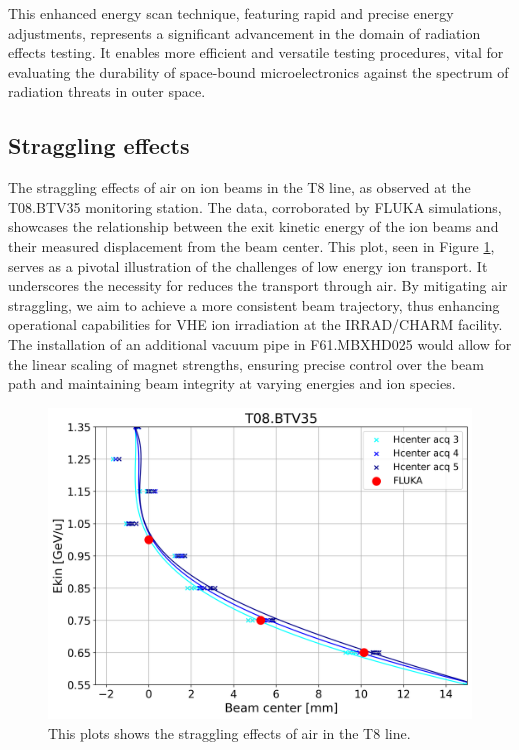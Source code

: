 \documentclass[a4paper,
               biblatex,     %
               ]{jacow}
\begin{document}
This enhanced energy scan technique, featuring rapid and precise energy adjustments, represents a significant advancement in the domain of radiation effects testing. It enables more efficient and versatile testing procedures, vital for evaluating the durability of space-bound microelectronics against the spectrum of radiation threats in outer space.

\subsection{Straggling effects}

The straggling effects of air on ion beams in the T8 line, as observed at the T08.BTV35 monitoring station. The data, corroborated by FLUKA simulations, showcases the relationship between the exit kinetic energy of the ion beams and their measured displacement from the beam center. This plot, seen in Figure \ref{fig:straggling_effects}, serves as a pivotal illustration of the challenges of low energy ion transport. It underscores the necessity for reduces the transport through air. By mitigating air straggling, we aim to achieve a more consistent beam trajectory, thus enhancing operational capabilities for VHE ion irradiation at the IRRAD/CHARM facility. The installation of an additional vacuum pipe in F61.MBXHD025 would allow for the linear scaling of magnet strengths, ensuring precise control over the beam path and maintaining beam integrity at varying energies and ion species.
\begin{figure}[!htb]
   \centering
   \includegraphics*[width=1.0\columnwidth]{straggling_effects.png}
   \caption{This plots shows the straggling effects of air in the T8 line.}
   \label{fig:straggling_effects}
\end{figure}
\end{document}
